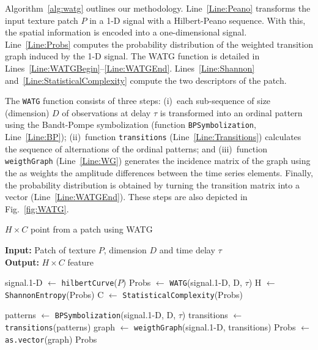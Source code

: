 \documentclass[journal]{IEEEtran}
\begin{document}
Algorithm~\ref{alg:watg} outlines our methodology.
Line~\ref{Line:Peano} transforms the input texture patch $P$ in a \mbox{1-D} signal with a Hilbert-Peano sequence.
%
With this, the spatial information is encoded into a one-dimensional signal.
%
Line~\ref{Line:Probs} computes 
the probability distribution of the weighted transition graph induced by the \mbox{1-D} signal.
The WATG function is detailed in Lines~\ref{Line:WATGBegin}--\ref{Line:WATGEnd}.
%
Lines~\ref{Line:Shannon} and~\ref{Line:StatisticalComplexity} compute the two descriptors of the patch.

The \texttt{WATG} function consists of three steps: 
(i)~each sub-sequence of size (dimension) $D$ of observations at delay $\tau$ is transformed into an ordinal pattern using the Bandt-Pompe symbolization (function \texttt{BPSymbolization}, Line~\ref{Line:BP}); 
(ii)~function \texttt{transitions} (Line~\ref{Line:Transitions}) calculates the sequence of alternations of the ordinal patterns; and 
(iii)~function \texttt{weigthGraph} (Line~\ref{Line:WG}) generates the incidence matrix of the graph using the as weights the amplitude differences between the time series elements.
Finally, the probability distribution is obtained by turning the transition matrix into a vector (Line~\ref{Line:WATGEnd}).
These steps are also depicted in Fig.~\ref{fig:WATG}.

\begin{algorithm}
	\caption{$H \times C$ point from a patch using WATG}
	\label{alg:watg}                                
	\textbf{Input:} Patch of texture $P$, dimension $D$ and time delay \textbf{$\tau$}\\
	\textbf{Output:} $H \times C$ feature
	\begin{algorithmic}[1]
		\State signal.\mbox{1-D} $\gets$ \texttt{hilbertCurve}($P$) \label{Line:Peano}
		\State Probs $\gets$ \texttt{WATG}(signal.\mbox{1-D}, D, $\tau$) \label{Line:Probs}
		\State H $\gets$ \texttt{ShannonEntropy}(Probs) \label{Line:Shannon}
		\State C $\gets$ \texttt{StatisticalComplexity}(Probs) \label{Line:StatisticalComplexity}
		
		\vspace{0.15cm}
		
		\State patterns $\gets$ \label{Line:WATGBegin} \texttt{BPSymbolization}(signal.\mbox{1-D}, D, $\tau$) \label{Line:BP}
		\State transitions $\gets$ \texttt{transitions}(patterns) \label{Line:Transitions}
		\State graph $\gets$ \texttt{weigthGraph}(signal.\mbox{1-D}, transitions) \label{Line:WG}
		\State Probs $\gets$ \texttt{as.vector}(graph) \label{Line:WATGEnd}
		\State \Return Probs
		\EndFunction
	\end{algorithmic}
\end{algorithm}
\end{document}
